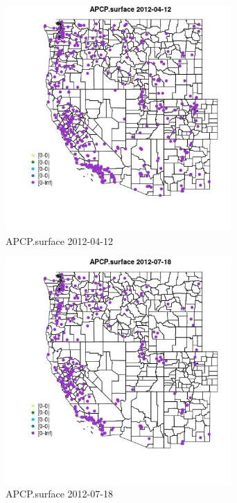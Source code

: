 \begin{figure} 
\centering  
\includegraphics[width=0.77\textwidth]{Code_Outputs/Report_ML_input_PM25_Step4_part_e_de_duplicated_aves_compiled_2019-05-14wNAs_MapObsAPCPsurface2012-04-12.jpg} 
\caption{\label{fig:Report_ML_input_PM25_Step4_part_e_de_duplicated_aves_compiled_2019-05-14wNAsMapObsAPCPsurface2012-04-12}APCP.surface 2012-04-12} 
\end{figure} 
 

\begin{figure} 
\centering  
\includegraphics[width=0.77\textwidth]{Code_Outputs/Report_ML_input_PM25_Step4_part_e_de_duplicated_aves_compiled_2019-05-14wNAs_MapObsAPCPsurface2012-07-18.jpg} 
\caption{\label{fig:Report_ML_input_PM25_Step4_part_e_de_duplicated_aves_compiled_2019-05-14wNAsMapObsAPCPsurface2012-07-18}APCP.surface 2012-07-18} 
\end{figure} 
 

